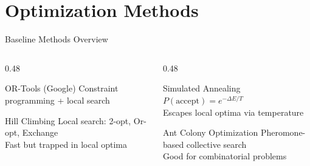 \documentclass[aspectratio=169,11pt]{beamer}
\begin{document}
\section{Optimization Methods}

\begin{frame}{Baseline Methods Overview}
    \begin{columns}[T]
        \begin{column}{0.48\textwidth}
            \begin{block}{OR-Tools (Google)}
                Constraint programming + local search
            \end{block}

            \begin{block}{Hill Climbing}
                Local search: 2-opt, Or-opt, Exchange\\
                Fast but trapped in local optima
            \end{block}
        \end{column}
        \begin{column}{0.48\textwidth}
            \begin{block}{Simulated Annealing}
                $P(\text{accept}) = e^{-\Delta E/T}$\\
                Escapes local optima via temperature
            \end{block}

            \begin{block}{Ant Colony Optimization}
                Pheromone-based collective search\\
                Good for combinatorial problems
            \end{block}
        \end{column}
    \end{columns}

    \vspace{0.4cm}
    \begin{center}
\end{center}
\end{frame}
\end{document}

